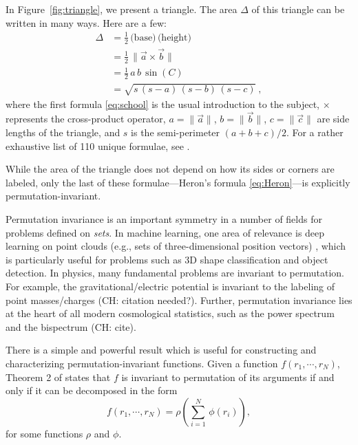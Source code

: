 \documentclass[12pt]{article}
\newcommand{\CH}[1]{{\color{blue} (CH: #1)}}
\begin{document}
In Figure~\ref{fig:triangle}, we present a triangle.
The area $\Delta$ of this triangle can be written in many ways.
Here are a few:
\begin{align}
\Delta 
&= \frac{1}{2} \, \text{(base)} \, \text{(height)} \label{eq:school} \\
&= \frac{1}{2}\, \| \vec{a} \times \vec{b} \| \label{eq:cross} \\
&= \frac{1}{2}\,a\,b\,\sin(C) \label{eq:sine} \\
&= \sqrt{s\,(s-a)\,(s-b)\,(s-c)} \label{eq:Heron} ~,
\end{align}
where the first formula \eqref{eq:school} is the usual introduction to the subject,
$\times$ represents the cross-product operator,
$a = \| \vec{a} \|$, $b = \| \vec{b} \|$, $c = \| \vec{c} \|$ are side lengths of the triangle,
and $s$ is the semi-perimeter $(a + b + c)/2$.
For a rather exhaustive list of 110 unique formulae, see \citet{baker1885a,baker1885b}.

While the area of the triangle does not depend on how its sides or corners are labeled,
only the last of these formulae---Heron's formula \eqref{eq:Heron}---is explicitly permutation-invariant.

Permutation invariance is an important symmetry in a number of fields for problems defined on \textit{sets}.
In machine learning, one area of relevance is deep learning on point clouds (e.g., sets of three-dimensional position vectors) \citep{guo2020pointclouds}, which is particularly useful for problems such as 3D shape classification and object detection.
In physics, many fundamental problems are invariant to permutation.
For example, the gravitational/electric potential is invariant to the labeling of point masses/charges \CH{citation needed?}.
Further, permutation invariance lies at the heart of all modern cosmological statistics, such as the power spectrum and the bispectrum \CH{cite}.

There is a simple and powerful result which is useful for constructing and characterizing permutation-invariant functions.
Given a function $f(r_1, \cdots, r_N)$, Theorem 2 of \citet{zaheer+17deepsets} states that $f$ is invariant to permutation of its arguments if and only if it can be decomposed in the form
\begin{equation}
    f(r_1, \cdots, r_N) = \rho \left( {\textstyle \sum_{i=1}^{N}} \, \phi(r_i) \right), \label{eq:DeepSets}
\end{equation}
for some functions $\rho$ and $\phi$.
\end{document}
